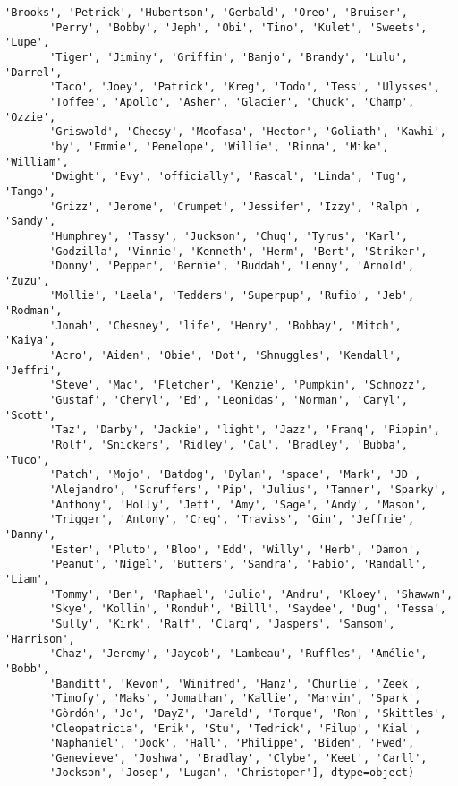\documentclass[11pt]{article}
\begin{document}
\begin{tcolorbox}[breakable, size=fbox, boxrule=.5pt, pad at break*=1mm, opacityfill=0]
\begin{Verbatim}[commandchars=\\\{\}]
       'Brooks', 'Petrick', 'Hubertson', 'Gerbald', 'Oreo', 'Bruiser',
       'Perry', 'Bobby', 'Jeph', 'Obi', 'Tino', 'Kulet', 'Sweets', 'Lupe',
       'Tiger', 'Jiminy', 'Griffin', 'Banjo', 'Brandy', 'Lulu', 'Darrel',
       'Taco', 'Joey', 'Patrick', 'Kreg', 'Todo', 'Tess', 'Ulysses',
       'Toffee', 'Apollo', 'Asher', 'Glacier', 'Chuck', 'Champ', 'Ozzie',
       'Griswold', 'Cheesy', 'Moofasa', 'Hector', 'Goliath', 'Kawhi',
       'by', 'Emmie', 'Penelope', 'Willie', 'Rinna', 'Mike', 'William',
       'Dwight', 'Evy', 'officially', 'Rascal', 'Linda', 'Tug', 'Tango',
       'Grizz', 'Jerome', 'Crumpet', 'Jessifer', 'Izzy', 'Ralph', 'Sandy',
       'Humphrey', 'Tassy', 'Juckson', 'Chuq', 'Tyrus', 'Karl',
       'Godzilla', 'Vinnie', 'Kenneth', 'Herm', 'Bert', 'Striker',
       'Donny', 'Pepper', 'Bernie', 'Buddah', 'Lenny', 'Arnold', 'Zuzu',
       'Mollie', 'Laela', 'Tedders', 'Superpup', 'Rufio', 'Jeb', 'Rodman',
       'Jonah', 'Chesney', 'life', 'Henry', 'Bobbay', 'Mitch', 'Kaiya',
       'Acro', 'Aiden', 'Obie', 'Dot', 'Shnuggles', 'Kendall', 'Jeffri',
       'Steve', 'Mac', 'Fletcher', 'Kenzie', 'Pumpkin', 'Schnozz',
       'Gustaf', 'Cheryl', 'Ed', 'Leonidas', 'Norman', 'Caryl', 'Scott',
       'Taz', 'Darby', 'Jackie', 'light', 'Jazz', 'Franq', 'Pippin',
       'Rolf', 'Snickers', 'Ridley', 'Cal', 'Bradley', 'Bubba', 'Tuco',
       'Patch', 'Mojo', 'Batdog', 'Dylan', 'space', 'Mark', 'JD',
       'Alejandro', 'Scruffers', 'Pip', 'Julius', 'Tanner', 'Sparky',
       'Anthony', 'Holly', 'Jett', 'Amy', 'Sage', 'Andy', 'Mason',
       'Trigger', 'Antony', 'Creg', 'Traviss', 'Gin', 'Jeffrie', 'Danny',
       'Ester', 'Pluto', 'Bloo', 'Edd', 'Willy', 'Herb', 'Damon',
       'Peanut', 'Nigel', 'Butters', 'Sandra', 'Fabio', 'Randall', 'Liam',
       'Tommy', 'Ben', 'Raphael', 'Julio', 'Andru', 'Kloey', 'Shawwn',
       'Skye', 'Kollin', 'Ronduh', 'Billl', 'Saydee', 'Dug', 'Tessa',
       'Sully', 'Kirk', 'Ralf', 'Clarq', 'Jaspers', 'Samsom', 'Harrison',
       'Chaz', 'Jeremy', 'Jaycob', 'Lambeau', 'Ruffles', 'Amélie', 'Bobb',
       'Banditt', 'Kevon', 'Winifred', 'Hanz', 'Churlie', 'Zeek',
       'Timofy', 'Maks', 'Jomathan', 'Kallie', 'Marvin', 'Spark',
       'Gòrdón', 'Jo', 'DayZ', 'Jareld', 'Torque', 'Ron', 'Skittles',
       'Cleopatricia', 'Erik', 'Stu', 'Tedrick', 'Filup', 'Kial',
       'Naphaniel', 'Dook', 'Hall', 'Philippe', 'Biden', 'Fwed',
       'Genevieve', 'Joshwa', 'Bradlay', 'Clybe', 'Keet', 'Carll',
       'Jockson', 'Josep', 'Lugan', 'Christoper'], dtype=object)
\end{Verbatim}
\end{tcolorbox}
        
\end{document}

